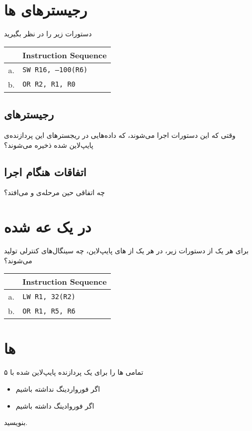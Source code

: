 \documentclass[11pt, dvipsnames, svgnames, x11names]{article}
\begin{document}
\section{رجیستر‌های ها}
دستورات زیر را در نظر بگیرید
\begin{latin}
\begin{table}[H]
\begin{center}
\begin{tabular}{|c|l|}
\hline
& Instruction Sequence \\
\hline
a. &
\texttt{SW R16, –100(R6)} \\
\hline
b. &
\texttt{OR R2, R1, R0} \\ 
\hline
\end{tabular}
\end{center}
\end{table}
\end{latin}
\subsection{رجیستر‌های }
وقتی که این دستورات اجرا می‌شوند، که داده‌هایی در ریجستر‌های این پردازنده‌ی پایپ‌لاین شده ذخیره می‌شوند؟

\subsection{اتفاقات هنگام اجرا}
چه اتفاقی حین مرحله‌ی  و  می‌افتد؟


\section{ در یک  عه  شده}
برای هر یک از دستورات زیر، در هر یک از های پایپ‌لاین، چه سینگال‌های کنترلی تولید می‌شوند؟
\begin{latin}
\begin{table}[H]
\begin{center}
\begin{tabular}{|c|l|}
\hline
& Instruction Sequence \\
\hline
a. &
\texttt{LW R1, 32(R2)} \\
\hline
b. &
\texttt{OR R1, R5, R6} \\ 
\hline
\end{tabular}
\end{center}
\end{table}
\end{latin}

\section{ها}
تمامی ها را برای یک پردازنده‌ پایپ‌لاین شده با ۵  
\begin{itemize}
\item 
اگر فورواردینگ نداشته باشیم
\item 
اگر فوروادینگ داشته باشیم
\end{itemize}
بنویسید.
\end{document}

